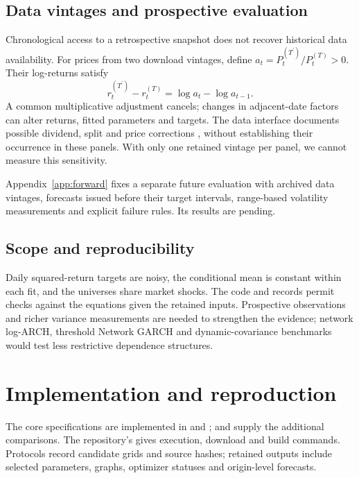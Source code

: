 \documentclass[12pt,a4paper]{article}
\begin{document}
\begin{table}[tbp]
\centering\small

\caption{Summary of the recorded findings. Lower mean losses describe this
sample; inferential qualifications follow Section~6.1.}
\label{tab:findings}
\end{table}

\subsection{Data vintages and prospective evaluation}
\label{sec:vintages}
Chronological access to a retrospective snapshot does not recover historical
data availability. For prices from two download vintages, define
$a_t=P_t^{(T^{\prime})}/P_t^{(T)}>0$. Their log-returns satisfy
\begin{equation}
r_t^{(T^{\prime})}-r_t^{(T)}
=\log a_t-\log a_{t-1}.
\label{eq:vintage-return}
\end{equation}
A common multiplicative adjustment cancels; changes in adjacent-date factors
can alter returns, fitted parameters and targets. The data interface documents
possible dividend, split and price corrections \citep{yfinance_repair}, without
establishing their occurrence in these panels. With only one retained vintage
per panel, we cannot measure this sensitivity.

Appendix~\ref{app:forward} fixes a separate future evaluation with archived
data vintages, forecasts issued before their target intervals, range-based
volatility measurements and explicit failure rules. Its results are pending.

\subsection{Scope and reproducibility}
Daily squared-return targets are noisy, the conditional mean is constant
within each fit, and the universes share market shocks. The code and records
permit checks against the equations given the retained inputs. Prospective
observations and richer variance measurements are needed to strengthen the
evidence; network log-ARCH, threshold Network GARCH and dynamic-covariance
benchmarks would test less restrictive dependence structures.

\appendix
\section{Implementation and reproduction}
The core specifications are implemented in 
and ;  and
 supply the additional comparisons. The repository's
 gives execution, download and build commands.
Protocols record candidate grids and source hashes; retained outputs include
selected parameters, graphs, optimizer statuses and origin-level forecasts.
\end{document}
